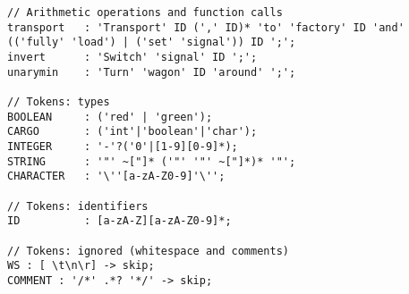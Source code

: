 \begin{landscape}
\begin{lstlisting}[style=Antlr]
// Arithmetic operations and function calls
transport   : 'Transport' ID (',' ID)* 'to' 'factory' ID 'and' (('fully' 'load') | ('set' 'signal')) ID ';';
invert      : 'Switch' 'signal' ID ';';
unarymin    : 'Turn' 'wagon' ID 'around' ';';

// Tokens: types
BOOLEAN     : ('red' | 'green');
CARGO       : ('int'|'boolean'|'char');
INTEGER     : '-'?('0'|[1-9][0-9]*);
STRING      : '"' ~["]* ('"' '"' ~["]*)* '"';
CHARACTER   : '\''[a-zA-Z0-9]'\'';

// Tokens: identifiers
ID          : [a-zA-Z][a-zA-Z0-9]*;

// Tokens: ignored (whitespace and comments)
WS : [ \t\n\r] -> skip;
COMMENT : '/*' .*? '*/' -> skip;
\end{lstlisting}
\end{landscape}
